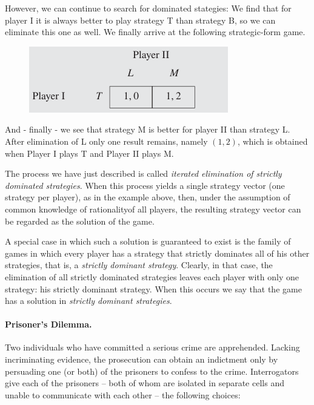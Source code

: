 However, we can continue to search for dominated stategies: We find that for player I it is always better to play strategy T than strategy B, so we can eliminate this one as well. We finally arrive at the following strategic-form game.

\begin{figure}[H]
    \centering
    \includegraphics[scale=0.75]{images/2023-10-10-game_theory_12.png}
\end{figure}

And - finally - we see that strategy M is better for player II than strategy L. After elimination of L only one result remains, namely $(1, 2)$, which is obtained when Player I plays T and Player II plays M.

The process we have just described is called \emph{iterated elimination of strictly dominated strategies}. When this process yields a single strategy vector (one strategy per player), as in the example above, then, under the assumption of common knowledge of rationalityof all players, the resulting strategy vector can be regarded as the solution of the game.

A special case in which such a solution is guaranteed to exist is the family of games in which every player has a strategy that strictly dominates all of his other strategies, that is, a \emph{strictly dominant strategy}. Clearly, in that case, the elimination of all strictly dominated strategies leaves each player with only one strategy: his strictly dominant strategy. When this occurs we say that the game has a solution in \emph{strictly dominant strategies}.

\paragraph{Prisoner's Dilemma.}\label{2023-10-10_pd} Two individuals who have committed a serious crime are apprehended. Lacking incriminating evidence, the prosecution can obtain an indictment only by persuading one (or both) of the prisoners to confess to the crime. Interrogators give each of the prisoners – both of whom are isolated in separate cells and unable to communicate with each other – the following choices:

